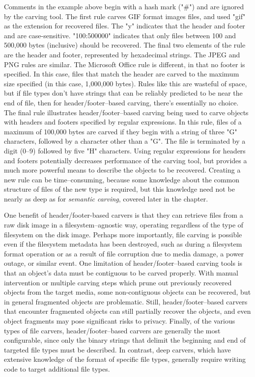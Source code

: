 Comments in the example above begin with a hash mark ("\#") and are
ignored by the carving tool.  The first rule carves GIF format images
files, and used "gif" as the extension for recovered files.  The "y"
indicates that the header and footer and are case-sensitive.
"100:500000" indicates that only files between 100 and 500,000 bytes
(inclusive) should be recovered.  The final two elements of the rule
are the header and footer, represented by hexadecimal strings.  The
JPEG and PNG rules are similar.  The Microsoft Office rule is
different, in that no footer is specified.  In this case, files that
match the header are carved to the maximum size specified (in this
case, 1,000,000 bytes).  Rules like this are wasteful of space, but if
file types don't have strings that can be reliably predicted to be
near the end of file, then for header/footer--based carving, there's
essentially no choice.  The final rule illustrates
header/footer--based carving being used to carve objects with headers
and footers specified by regular expressions.  In this rule, files of
a maximum of 100,000 bytes are carved if they begin with a string of
three "G" characters, followed by a character other than a "G".  The
file is terminated by a digit (0--9) followed by five "H" characters.
Using regular expressions for headers and footers potentially
decreases performance of the carving tool, but provides a much more
powerful means to describe the objects to be recovered.  Creating a
new rule can be time--consuming, because some knowledge about the
common structure of files of the new type is required, but this
knowledge need not be nearly as deep as for \emph{semantic carving},
covered later in the chapter.

One benefit of header/footer-based carvers is that they can retrieve
files from a raw disk image in a filesystem--agnostic way, operating
regardless of the type of filesystem on the disk image.  Perhaps more
importantly, file carving is possible even if the filesystem metadata
has been destroyed, such as during a filesystem format operation or as
a result of file corruption due to media damage, a power outage, or
similar event.  One limitation of header/footer--based carving tools
is that an object's data must be contiguous to be carved properly.
With manual intervention or multiple carving steps which prune out
previously recovered objects from the target media, some
non-contiguous objects can be recovered, but in general fragmented
objects are problematic.  Still, header/footer--based carvers that
encounter fragmented objects can still partially recover the objects,
and even object fragments may pose significant risks to privacy.
Finally, of the various types of file carvers, header/footer--based
carvers are generally the most configurable, since only the binary
strings that delimit the beginning and end of targeted file types must
be described.  In contrast, deep carvers, which have extensive
knowledge of the format of specific file types, generally require
writing code to target additional file types.

